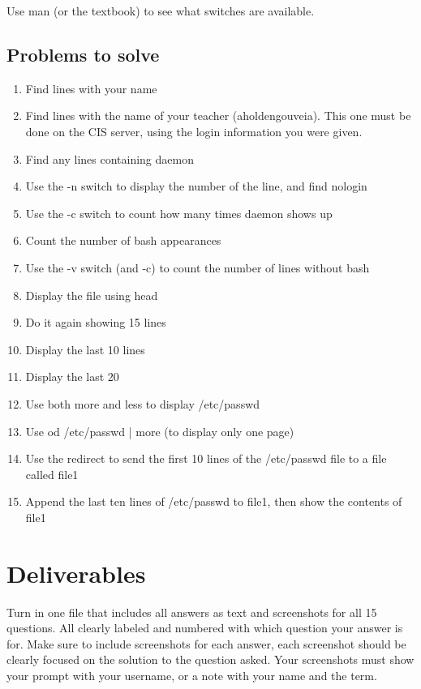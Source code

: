 \documentclass[12pt]{article}
\begin{document}
Use man (or the textbook) to see what switches are available.


\subsection*{Problems to solve}
    \begin{enumerate}
        \item  Find lines with your name
        \item  Find lines with the name of your teacher (aholdengouveia). This one must be done on the CIS server, using the login information you were given.
        \item  Find any lines containing daemon
        \item  Use the -n switch to display the number of the line, and find nologin
        \item  Use the -c switch to count how many times daemon shows up
        \item  Count the number of bash appearances
        \item  Use the -v switch (and -c) to count the number of lines without bash
        \item  Display the file using head
        \item  Do it again showing 15 lines
        \item  Display the last 10 lines
        \item  Display the last 20
        \item  Use both more and less to display /etc/passwd
        \item  Use od /etc/passwd | more (to display only one page)
        \item  Use the redirect to send the first 10 lines of the /etc/passwd file to a file called file1
        \item  Append the last ten lines of /etc/passwd to file1, then show the contents of file1
    \end{enumerate}


\section*{Deliverables}
Turn in one file that includes all answers as text and screenshots for all 15 questions. All clearly labeled and numbered with which question your answer is for. Make sure to include screenshots for each answer, each screenshot should be clearly focused on the solution to the question asked. Your screenshots must show your prompt with your username, or a note with your name and the term.
\end{document}
